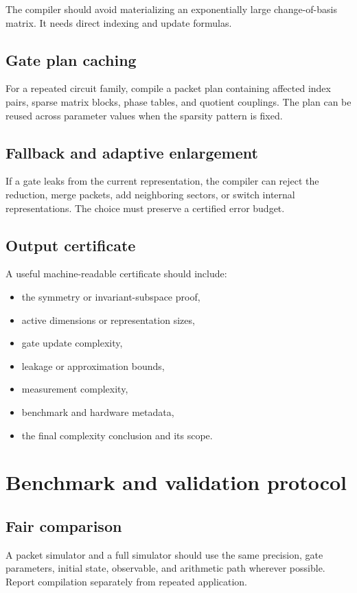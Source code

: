 The compiler should avoid materializing an exponentially large change-of-basis matrix. It needs direct indexing and update formulas.

\subsection{Gate plan caching}
For a repeated circuit family, compile a packet plan containing affected index pairs, sparse matrix blocks, phase tables, and quotient couplings. The plan can be reused across parameter values when the sparsity pattern is fixed.

\subsection{Fallback and adaptive enlargement}
If a gate leaks from the current representation, the compiler can reject the reduction, merge packets, add neighboring sectors, or switch internal representations. The choice must preserve a certified error budget.

\subsection{Output certificate}
A useful machine-readable certificate should include:

\begin{itemize}
\item the symmetry or invariant-subspace proof,
\item active dimensions or representation sizes,
\item gate update complexity,
\item leakage or approximation bounds,
\item measurement complexity,
\item benchmark and hardware metadata,
\item the final complexity conclusion and its scope.
\end{itemize}

\section{Benchmark and validation protocol}
\label{s:ch:benchmark-protocol}

\subsection{Fair comparison}
A packet simulator and a full simulator should use the same precision, gate parameters, initial state, observable, and arithmetic path wherever possible. Report compilation separately from repeated application.

